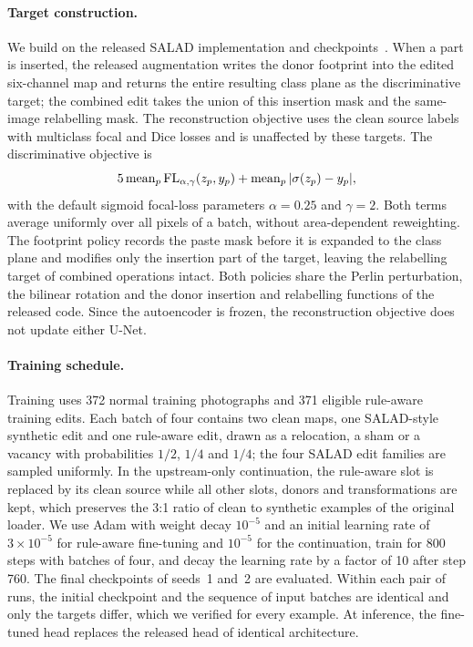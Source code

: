 \paragraph{Target construction.}
We build on the released SALAD implementation and checkpoints~\cite{fucka2025}. When a part is inserted, the released augmentation writes the donor footprint into the edited six-channel map and returns the entire resulting class plane as the discriminative target; the combined edit takes the union of this insertion mask and the same-image relabelling mask. The reconstruction objective uses the clean source labels with multiclass focal and Dice losses and is unaffected by these targets. The discriminative objective is
\[
  5\,{\rm mean}_{p}\,{\rm FL}_{\alpha,\gamma}(z_p,y_p)
  + {\rm mean}_{p}\,|\sigma(z_p)-y_p|,
\]
with the default sigmoid focal-loss parameters $\alpha=0.25$ and $\gamma=2$. Both terms average uniformly over all pixels of a batch, without area-dependent reweighting. The footprint policy records the paste mask before it is expanded to the class plane and modifies only the insertion part of the target, leaving the relabelling target of combined operations intact. Both policies share the Perlin perturbation, the bilinear rotation and the donor insertion and relabelling functions of the released code. Since the autoencoder is frozen, the reconstruction objective does not update either U-Net.

\paragraph{Training schedule.}
Training uses 372 normal training photographs and 371 eligible rule-aware training edits. Each batch of four contains two clean maps, one SALAD-style synthetic edit and one rule-aware edit, drawn as a relocation, a sham or a vacancy with probabilities $1/2$, $1/4$ and $1/4$; the four SALAD edit families are sampled uniformly. In the upstream-only continuation, the rule-aware slot is replaced by its clean source while all other slots, donors and transformations are kept, which preserves the 3:1 ratio of clean to synthetic examples of the original loader. We use Adam with weight decay $10^{-5}$ and an initial learning rate of $3{\times}10^{-5}$ for rule-aware fine-tuning and $10^{-5}$ for the continuation, train for 800 steps with batches of four, and decay the learning rate by a factor of 10 after step 760. The final checkpoints of seeds~1 and~2 are evaluated. Within each pair of runs, the initial checkpoint and the sequence of input batches are identical and only the targets differ, which we verified for every example. At inference, the fine-tuned head replaces the released head of identical architecture.

